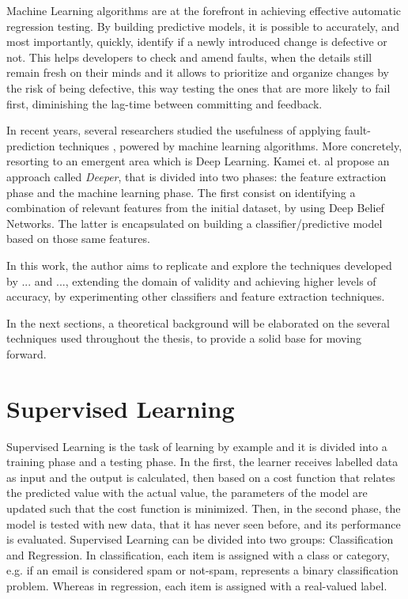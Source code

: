 Machine Learning algorithms are at the forefront in achieving effective automatic regression testing. By building predictive models, it is possible to accurately, and most importantly, quickly, identify if a newly introduced change is defective or not. This helps developers to check and amend faults, when the details still remain fresh on their minds and it allows to prioritize and organize changes by the risk of being defective, this way testing the ones that are more likely to fail first, diminishing the lag-time between committing and feedback.

In recent years, several researchers studied the usefulness of applying fault-prediction techniques , powered by machine learning algorithms. %
More concretely, resorting to an emergent area which is Deep Learning. Kamei et. al propose an approach called \textit{Deeper}, that is divided into two phases: the feature extraction phase and the machine learning phase. The first consist on identifying a combination of relevant features from the initial dataset, by using Deep Belief Networks. The latter is encapsulated on building a classifier/predictive model based on those same features.

In this work, the author aims to replicate and explore the techniques developed by ... and ..., extending the domain of validity and achieving higher levels of accuracy, by experimenting other classifiers and feature extraction techniques.

In the next sections, a theoretical background will be elaborated on the several techniques used throughout the thesis, to provide a solid base for moving forward.

\section{Supervised Learning}

Supervised Learning is the task of learning by example and it is divided into a training phase and a testing phase. In the first, the learner receives labelled data as input and the output is calculated, then based on a cost function that relates the predicted value with the actual value, the parameters of the model are updated such that the cost function is minimized. Then, in the second phase, the model is tested with new data, that it has never seen before, and its performance is evaluated. 
Supervised Learning can be divided into two groups: Classification and Regression. In classification, each item is assigned with a class or category, e.g. if an email is considered spam or not-spam, represents a binary classification problem. Whereas in regression, each item is assigned with a real-valued label. \cite{HanDataMining}



